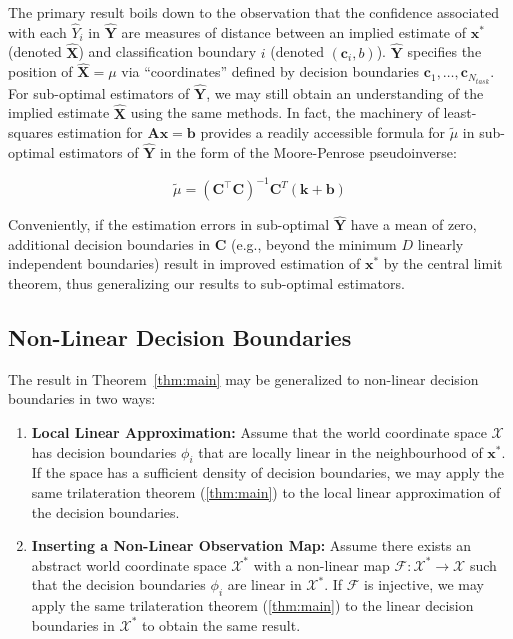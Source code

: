 \documentclass[12pt]{article}
\begin{document}
The primary result boils down to the observation that the confidence associated with each $\hat Y_i$ in $\hat{\mathbf Y}$ are measures of distance between an implied estimate of $\mathbf x^*$ (denoted $\hat {\mathbf X}$) and classification boundary $i$ (denoted $(\mathbf c_i, b)$). 
$\hat{\mathbf Y}$ specifies the position of $\hat{\mathbf X} = \mu$ via ``coordinates'' defined by decision boundaries $\mathbf c_1, \dots, \mathbf c_{N_{task}}$. \\


For sub-optimal estimators of $\hat{\mathbf Y}$, we may still obtain an understanding of the implied estimate $\hat{\mathbf X}$ using the same methods. 
In fact, the machinery of least-squares estimation for $\mathbf {Ax = b}$ provides a readily accessible formula for $\tilde \mu$ in sub-optimal estimators of $\hat{\mathbf Y}$ in the form of the Moore-Penrose pseudoinverse: 

\begin{equation}
	\tilde \mu = (\mathbf{C^\top C})^{-1}\mathbf C^T ( \mathbf k  + \mathbf b )
\end{equation}


Conveniently, if the estimation errors in sub-optimal $\hat{\mathbf Y}$ have a mean of zero, additional decision boundaries in $\mathbf C$ (e.g., beyond the minimum $D$ linearly independent boundaries) result in improved estimation of $\mathbf x^*$ by the central limit theorem, thus generalizing our results to sub-optimal estimators. 


\subsection{Non-Linear Decision Boundaries}

The result in Theorem~\ref{thm:main} may be generalized to non-linear decision boundaries in two ways: 
\begin{enumerate}
\item \textbf{Local Linear Approximation: } Assume that the world coordinate space $\mathcal X$ has decision boundaries $\phi_i$ that are locally linear in the neighbourhood of $\mathbf x^*$. If the space has a sufficient density of decision boundaries, we may apply the same trilateration theorem (\ref{thm:main}) to the local linear approximation of the decision boundaries.
\item \textbf{Inserting a Non-Linear Observation Map: } Assume there exists an abstract world coordinate space $\mathcal X^*$ with a non-linear map $\mathcal F: \mathcal X^* \to \mathcal X$ such that the decision boundaries $\phi_i$ are linear in $\mathcal X^*$. If $\mathcal F$ is injective, we may apply the same trilateration theorem (\ref{thm:main}) to the linear decision boundaries in $\mathcal X^*$ to obtain the same result. 
\end{enumerate}
\end{document}
